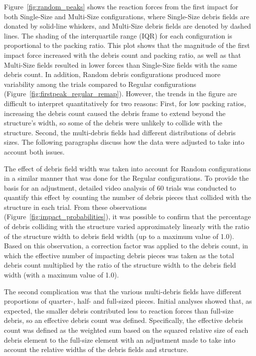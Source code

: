 \documentclass[10pt,a4paper]{article}
\begin{document}
Figure~\ref{fig:random_peaks} shows the reaction forces from the first impact for both Single-Size and Multi-Size configurations, where Single-Size debris fields are donated by solid-line whiskers, and Multi-Size debris fields are denoted by dashed lines. The shading of the interquartile range (IQR) for each configuration is proportional to the packing ratio. This plot shows that the magnitude of the first impact force increased with the debris count and packing ratio, as well as that Multi-Size fields resulted in lower forces than Single-Size fields with the same debris count. In addition, Random debris configurations produced more variability among the trials compared to Regular configurations (Figure~\ref{fig:firstpeak_regular_remap}). However, the trends in the figure are difficult to interpret quantitatively for two reasons: First, for low packing ratios, increasing the debris count caused the debris frame to extend beyond the structure’s width, so some of the debris were unlikely to collide with the structure. Second, the multi-debris fields had different distributions of debris sizes. The following paragraphs discuss how the data were adjusted to take into account both issues.

The effect of debris field width was taken into account for Random configurations in a similar manner that was done for the Regular configurations.  To provide the basis for an adjustment, detailed video analysis of 60 trials was conducted to quantify this effect by counting the number of debris pieces that collided with the structure in each trial. From these observations (Figure~\ref{fig:impact_probabilities}), it was possible to confirm that the percentage of debris colliding with the structure varied approximately linearly with the ratio of the structure width to debris field width (up to a maximum value of 1.0). Based on this observation, a correction factor was applied to the debris count, in which the effective number of impacting debris pieces was taken as the total debris count multiplied by the ratio of the structure width to the debris field width (with a maximum value of 1.0).

The second complication was that the various multi-debris fields have different proportions of quarter-, half-  and full-sized pieces. Initial analyses showed that, as expected, the smaller debris contributed less to reaction forces than full-size debris, so an effective debris count was defined. Specifically, the effective debris count was defined as the weighted sum based on the squared relative size of each debris element to the full-size element with an adjustment made to take into account the relative widths of the debris fields and structure.
\end{document}
